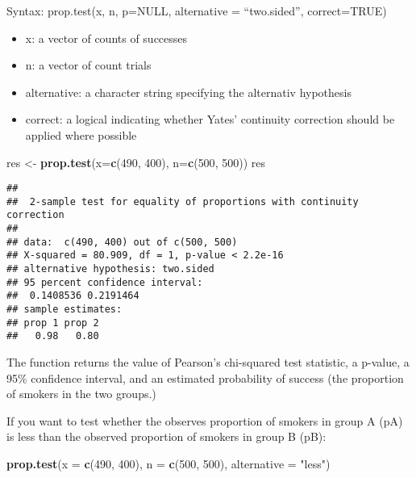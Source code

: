 \documentclass[
]{article}
\newenvironment{Shaded}{\begin{snugshade}}{\end{snugshade}}
\newcommand{\DataTypeTok}[1]{\textcolor[rgb]{0.13,0.29,0.53}{#1}}
\newcommand{\DecValTok}[1]{\textcolor[rgb]{0.00,0.00,0.81}{#1}}
\newcommand{\KeywordTok}[1]{\textcolor[rgb]{0.13,0.29,0.53}{\textbf{#1}}}
\newcommand{\NormalTok}[1]{#1}
\newcommand{\StringTok}[1]{\textcolor[rgb]{0.31,0.60,0.02}{#1}}
\providecommand{\tightlist}{%
  \setlength{\itemsep}{0pt}\setlength{\parskip}{0pt}}
\begin{document}
Syntax: prop.test(x, n, p=NULL, alternative = ``two.sided'',
correct=TRUE)

\begin{itemize}
\tightlist
\item
  x: a vector of counts of successes
\item
  n: a vector of count trials
\item
  alternative: a character string specifying the alternativ hypothesis
\item
  correct: a logical indicating whether Yates' continuity correction
  should be applied where possible
\end{itemize}

\begin{Shaded}
\begin{Highlighting}[]
\NormalTok{res <-}\StringTok{ }\KeywordTok{prop.test}\NormalTok{(}\DataTypeTok{x=}\KeywordTok{c}\NormalTok{(}\DecValTok{490}\NormalTok{, }\DecValTok{400}\NormalTok{), }\DataTypeTok{n=}\KeywordTok{c}\NormalTok{(}\DecValTok{500}\NormalTok{, }\DecValTok{500}\NormalTok{))}
\NormalTok{res}
\end{Highlighting}
\end{Shaded}

\begin{verbatim}
## 
##  2-sample test for equality of proportions with continuity correction
## 
## data:  c(490, 400) out of c(500, 500)
## X-squared = 80.909, df = 1, p-value < 2.2e-16
## alternative hypothesis: two.sided
## 95 percent confidence interval:
##  0.1408536 0.2191464
## sample estimates:
## prop 1 prop 2 
##   0.98   0.80
\end{verbatim}

The function returns the value of Pearson's chi-squared test statistic,
a p-value, a 95\% confidence interval, and an estimated probability of
success (the proportion of smokers in the two groups.)

If you want to test whether the observes proportion of smokers in group
A (pA) is less than the observed proportion of smokers in group B (pB):

\begin{Shaded}
\begin{Highlighting}[]
\KeywordTok{prop.test}\NormalTok{(}\DataTypeTok{x =} \KeywordTok{c}\NormalTok{(}\DecValTok{490}\NormalTok{, }\DecValTok{400}\NormalTok{), }\DataTypeTok{n =} \KeywordTok{c}\NormalTok{(}\DecValTok{500}\NormalTok{, }\DecValTok{500}\NormalTok{),}
           \DataTypeTok{alternative =} \StringTok{"less"}\NormalTok{)}
\end{Highlighting}
\end{Shaded}
\end{document}
